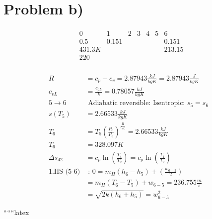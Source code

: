 \section*{Problem b)}

\begin{align*}
&\begin{array}{c|c|c|c|c|c|c}
0 & 1 & 2 & 3 & 4 & 5 & 6 \\
\hline
0.5 & 0.151 & & & & & 0.151 \\
431.3K & & & & & & 213.15 \\
220 & & & & & & \\
\end{array}
\end{align*}

\begin{align*}
R &= c_p - c_v = 2.87943 \frac{kJ}{kgK} = 2.87943 \frac{J}{kgK} \\
c_{vL} &= \frac{c_{pL}}{k} = 0.78057 \frac{kJ}{kgK} \\
5 \rightarrow 6 &\text{ Adiabatic reversible: Isentropic: } s_5 = s_6 \\
s(T_5) &= 2.66533 \frac{kJ}{kgK} \\
T_6 &= T_5 \left(\frac{P_6}{P_5}\right)^{\frac{R}{c_{vL}}} = 2.66533 \frac{kJ}{kgK} \\
T_6 &= 328.097 K \\
\Delta s_{42} &= c_p \ln \left(\frac{T_4}{T_2}\right) = c_p \ln \left(\frac{T_4}{T_2}\right) \\
1. \text{HS (5-6)} &\text{ : } 0 = m_H (h_6 - h_5) + \left(\frac{w_{6-5}}{2}\right) \\
&= m_H (T_6 - T_5) + w_{6-5} = 236.755 \frac{m}{s} \\
&= \sqrt{2k(h_6 + h_5)} = w_{6-5}^2
\end{align*}

``````latex